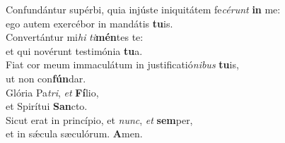\evenverse Confundántur supérbi, quia injúste iniquitátem fe\textit{cé}\textit{runt} \textbf{in} me:~\*\\
\evenverse ego autem exercébor in mandátis \textbf{tu}is.\\
\oddverse Convertántur mi\textit{hi} \textit{ti}\textbf{mén}tes te:~\*\\
\oddverse et qui novérunt testimónia \textbf{tu}a.\\
\evenverse Fiat cor meum immaculátum in justificatió\textit{ni}\textit{bus} \textbf{tu}is,~\*\\
\evenverse ut non con\textbf{fún}dar.\\
\oddverse Glória Pa\textit{tri}, \textit{et} \textbf{Fí}lio,~\*\\
\oddverse et Spirítui \textbf{San}cto.\\
\evenverse Sicut erat in princípio, et \textit{nunc}, \textit{et} \textbf{sem}per,~\*\\
\evenverse et in sǽcula sæculórum. \textbf{A}men.\\
